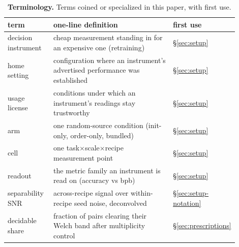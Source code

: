 \begin{table}[!htbp]
\centering
\caption{\textbf{Terminology.} Terms coined or specialized in this paper, with first use.}
\label{tab:terms}
\footnotesize
\setlength{\tabcolsep}{4pt}
\begin{tabular}{@{}p{0.20\linewidth}p{0.56\linewidth}p{0.14\linewidth}@{}}
\toprule
term & one-line definition & first use \\
\midrule
decision instrument & cheap measurement standing in for an expensive one (retraining) & \S\ref{sec:setup} \\
home setting & configuration where an instrument's advertised performance was established & \S\ref{sec:setup} \\
usage license & conditions under which an instrument's readings stay trustworthy & \S\ref{sec:setup} \\
arm & one random-source condition (init-only, order-only, bundled) & \S\ref{sec:setup} \\
cell & one task$\times$scale$\times$recipe measurement point & \S\ref{sec:setup} \\
readout & the metric family an instrument is read on (accuracy vs bpb) & \S\ref{sec:setup} \\
separability SNR & across-recipe signal over within-recipe seed noise, deconvolved & \S\ref{sec:setup-notation} \\
decidable share & fraction of pairs clearing their Welch band after multiplicity control & \S\ref{sec:prescriptions} \\
\bottomrule
\end{tabular}
\end{table}
